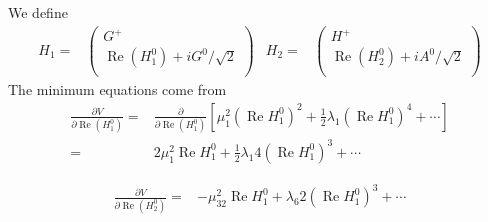 We define
\begin{align}
  H_1=&
  \begin{pmatrix}
    G^{+}\\
    \operatorname{Re}\left( H_1^{0} \right)+i G^{0}/\sqrt{2}\\
  \end{pmatrix}&
  H_2=&
  \begin{pmatrix}
    H^{+}\\
    \operatorname{Re}\left( H_2^{0} \right)+i A^{0}/\sqrt{2}\\
  \end{pmatrix}
\end{align}
The minimum equations come from
\begin{align}
  \frac{\partial V}{\partial \operatorname{Re}\left( H_1^{0} \right)}=&
\frac{\partial }{\partial \operatorname{Re}\left( H_1^{0} \right)} \left[ 
\mu^{2}_{1}\left(\operatorname{Re}H_{1}^{0}  \right)^2
+\frac{1}{2}\lambda_1 \left(\operatorname{Re}H_{1}^{0}  \right)^4+\cdots  \right]\nonumber\\
=&2\mu^{2}_{1}\operatorname{Re}H_{1}^{0}  
+\frac{1}{2}\lambda_1 4 \left(\operatorname{Re}H_{1}^{0}  \right)^3+\cdots
\end{align}

\begin{align}
  \frac{\partial V}{\partial \operatorname{Re}\left( H_2^{0} \right)}=&
-\mu^2_32\operatorname{Re}H_1^0+\lambda_6 2  \left(\operatorname{Re}H_1^0 \right)^3+\cdots
\end{align}


